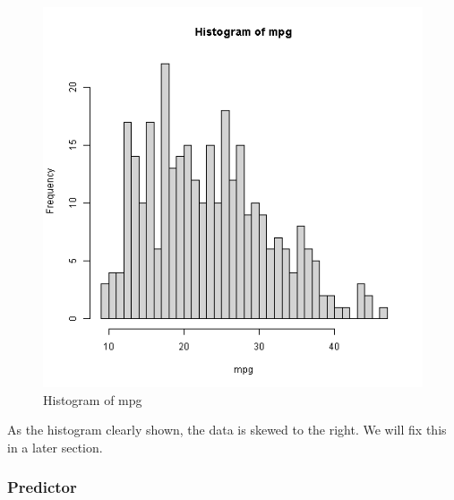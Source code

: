 \begin{figure}[H]
\centering
\includegraphics[scale=0.55]{img/mpghist.png}
\caption{Histogram of mpg}
\label{fig:hist_of_mpg}
\end{figure}

As the histogram clearly shown, the data is skewed to the right. We will fix this in a later section.

\subsubsection{Predictor}

